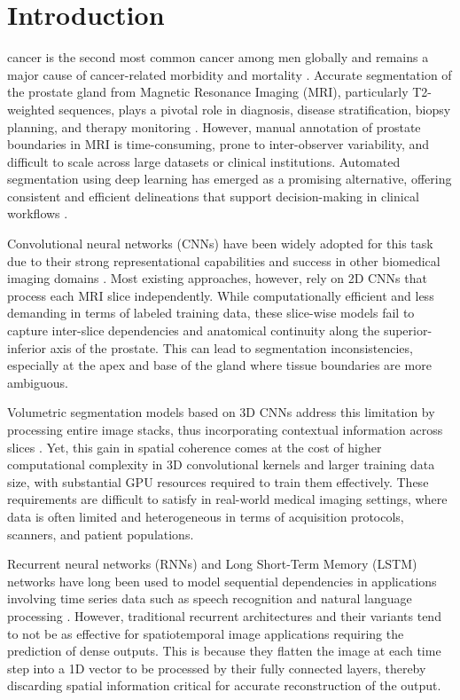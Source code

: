 \documentclass[journal]{IEEEtran}
\begin{document}
\section{Introduction}
 cancer is the second most common cancer among men globally and remains a major cause of cancer-related morbidity and mortality \cite{Fassia2024}. Accurate segmentation of the prostate gland from Magnetic Resonance Imaging (MRI), particularly T2-weighted sequences, plays a pivotal role in diagnosis, disease stratification, biopsy planning, and therapy monitoring \cite{Eddardaa2021}. However, manual annotation of prostate boundaries in MRI is time-consuming, prone to inter-observer variability, and difficult to scale across large datasets or clinical institutions. Automated segmentation using deep learning has emerged as a promising alternative, offering consistent and efficient delineations that support decision-making in clinical workflows \cite{Iosif2021}.

Convolutional neural networks (CNNs) have been widely adopted for this task due to their strong representational capabilities and success in other biomedical imaging domains \cite{Kuruparan2022, jensen2019prostate, khan2019zonal ,baldeon2020adaresu}. Most existing approaches, however, rely on 2D CNNs that process each MRI slice independently. While computationally efficient and less demanding in terms of labeled training data, these slice-wise models fail to capture inter-slice dependencies and anatomical continuity along the superior-inferior axis of the prostate. This can lead to segmentation inconsistencies, especially at the apex and base of the gland where tissue boundaries are more ambiguous.

Volumetric segmentation models based on 3D CNNs address this limitation by processing entire image stacks, thus incorporating contextual information across slices \cite{mehrtash2018automatic, to2018deep}. Yet, this gain in spatial coherence comes at the cost of higher computational complexity in 3D convolutional kernels and larger training data size, with substantial GPU resources required to train them effectively. These requirements are difficult to satisfy in real-world medical imaging settings, where data is often limited and heterogeneous in terms of acquisition protocols, scanners, and patient populations.

Recurrent neural networks (RNNs) and Long Short-Term Memory (LSTM) networks have long been used to model sequential dependencies in applications involving time series data such as speech recognition \cite{graves2013hybrid} and natural language processing \cite{wang2018lstm}. However, traditional recurrent architectures and their variants tend to not be as effective for spatiotemporal image applications requiring the prediction of dense outputs. This is because they flatten the image at each time step into a 1D vector to be processed by their fully connected layers, thereby discarding spatial information critical for accurate reconstruction of the output. 
\end{document}
